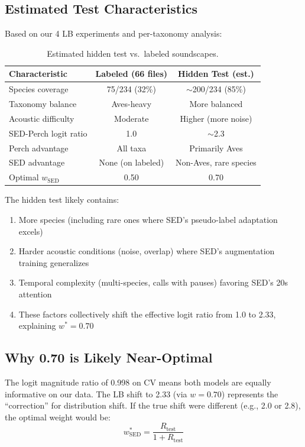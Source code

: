 \documentclass[a4paper,11pt]{article}
\begin{document}
\subsection{Estimated Test Characteristics}

Based on our 4 LB experiments and per-taxonomy analysis:

\begin{table}[h]
\centering
\caption{Estimated hidden test vs.\ labeled soundscapes.}
\begin{tabular}{lcc}
\toprule
Characteristic & Labeled (66 files) & Hidden Test (est.) \\
\midrule
Species coverage & 75/234 (32\%) & $\sim$200/234 (85\%) \\
Taxonomy balance & Aves-heavy & More balanced \\
Acoustic difficulty & Moderate & Higher (more noise) \\
SED-Perch logit ratio & 1.0 & $\sim$2.3 \\
Perch advantage & All taxa & Primarily Aves \\
SED advantage & None (on labeled) & Non-Aves, rare species \\
Optimal $w_\text{SED}$ & 0.50 & 0.70 \\
\bottomrule
\end{tabular}
\label{tab:test_est}
\end{table}

The hidden test likely contains:
\begin{enumerate}
\item More species (including rare ones where SED's pseudo-label adaptation excels)
\item Harder acoustic conditions (noise, overlap) where SED's augmentation training generalizes
\item Temporal complexity (multi-species, calls with pauses) favoring SED's 20s attention
\item These factors collectively shift the effective logit ratio from 1.0 to 2.33, explaining $w^*=0.70$
\end{enumerate}

\subsection{Why 0.70 is Likely Near-Optimal}

The logit magnitude ratio of 0.998 on CV means both models are equally informative on our data.
The LB shift to 2.33 (via $w=0.70$) represents the ``correction'' for distribution shift.
If the true shift were different (e.g., 2.0 or 2.8), the optimal weight would be:
\begin{equation}
w^*_\text{SED} = \frac{R_\text{test}}{1 + R_\text{test}}
\end{equation}
\end{document}
